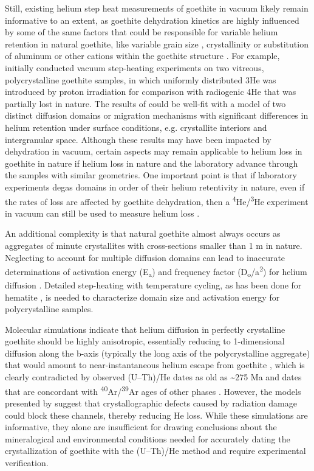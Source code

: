 Still, existing helium step heat measurements of goethite in vacuum
likely remain informative to an extent, as goethite dehydration kinetics
are highly influenced by some of the same factors that could be
responsible for variable helium retention in natural goethite, like
variable grain size \citep{navrotsky2008,guobarnard2011,goss1987}, crystallinity \citep{schwertmann1985} or substitution of
aluminum or other cations within the goethite structure \citep{majzlan2003,bassal2022}. For example, \citet{shustervasconcelos2005} initially
conducted vacuum step-heating experiments on two vitreous,
polycrystalline goethite samples, in which uniformly distributed 3He was
introduced by proton irradiation for comparison with radiogenic 4He that
was partially lost in nature. The results of \citet{shustervasconcelos2005} could
be well-fit with a model of two distinct diffusion domains or migration
mechanisms with significant differences in helium retention under
surface conditions, e.g. crystallite interiors and intergranular space.
Although these results may have been impacted by dehydration in vacuum,
certain aspects may remain applicable to helium loss in goethite in
nature if helium loss in nature and the laboratory advance through the
samples with similar geometries. One important point is that if
laboratory experiments degas domains in order of their helium
retentivity in nature, even if the rates of loss are affected by
goethite dehydration, then a \textsuperscript{4}He/\textsuperscript{3}He
experiment in vacuum can still be used to measure helium loss \citep{shustervasconcelos2005,vasconcelos2013}.

An additional complexity is that natural goethite almost always occurs
as aggregates of minute crystallites with cross-sections smaller than 1
\textmu m in nature. Neglecting to account for multiple diffusion domains can
lead to inaccurate determinations of activation energy
(E\textsubscript{a}) and frequency factor
(D\textsubscript{o}/a\textsuperscript{2}) for helium diffusion \citep{farley2018}. Detailed step-heating with temperature cycling, as has been done
for hematite \citep{farleyflowers2012,farley2018}, is needed to
characterize domain size and activation energy for polycrystalline
samples.

Molecular simulations indicate that helium diffusion in perfectly
crystalline goethite should be highly anisotropic, essentially reducing
to 1-dimensional diffusion along the b-axis (typically the long axis of
the polycrystalline aggregate) that would amount to near-instantaneous
helium escape from goethite \citep{bassal2022}, which is clearly
contradicted by observed (U--Th)/He dates as old as \textasciitilde275 Ma
\citep{waltenberg2012} and dates that are concordant with
\textsuperscript{40}Ar/\textsuperscript{39}Ar ages of other phases
\citep{vasconcelos2013}. However, the models presented by \citet{bassal2022} suggest that crystallographic defects caused by radiation
damage could block these channels, thereby reducing He loss. While these
simulations are informative, they alone are insufficient for drawing
conclusions about the mineralogical and environmental conditions needed
for accurately dating the crystallization of goethite with the
(U--Th)/He method and require experimental verification.

